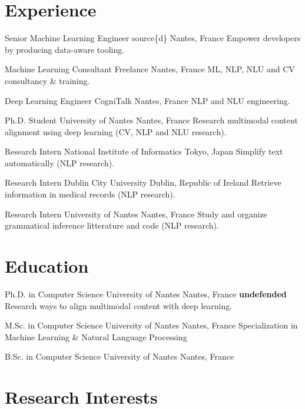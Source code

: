 \documentclass[11pt,a4paper,sans]{moderncv}        %
\newcommand{\textover}[3][l]{%
  \makebox[\widthof{#3}][#1]{#2}%
}
\begin{document}
\makecvtitle

\section{Experience}

\cventry{08/18–\textover{now}{03/18}}%
{Senior Machine Learning Engineer}%
{source\{d\}}%
{Nantes, France}%
{}%
{Empower developers by producing data-aware tooling.}

%
{Machine Learning Consultant}%
{Freelance}%
{Nantes, France}%
{}%
{ML, NLP, NLU and CV consultancy \& training.}

%
{Deep Learning Engineer}%
{CogniTalk}%
{Nantes, France}%
{}%
{NLP and NLU engineering.}

%
{Ph.D. Student}%
{University of Nantes}%
{Nantes, France}%
{}%
{Research multimodal content alignment using deep learning (CV, NLP
  and NLU research).}

%
{Research Intern}%
{National Institute of Informatics}%
{Tokyo, Japan}%
{}%
{Simplify text automatically (NLP research).}

%
{Research Intern}%
{Dublin City University}%
{Dublin, Republic of Ireland}%
{}%
{Retrieve information in medical records (NLP research).}

%
{Research Intern}%
{University of Nantes}%
{Nantes, France}%
{}%
{Study and organize grammatical inference litterature and code
  (NLP research).}

\section{Education}

%
{Ph.D. in Computer Science}%
{University of Nantes}%
{Nantes, France}%
{\textbf{undefended}}%
{Research ways to align multimodal content with deep learning.}

%
{M.Sc. in Computer Science}%
{University of Nantes}%
{Nantes, France}%
{}%
{Specialization in Machine Learning \& Natural Language Processing}

%
{B.Sc. in Computer Science}%
{University of Nantes}%
{Nantes, France}%
{}%
{}

\section{Research Interests}
\end{document}
